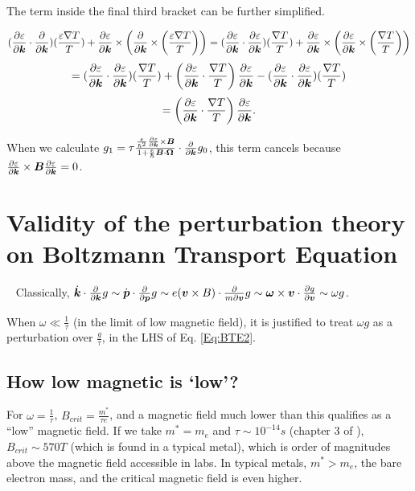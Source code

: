 \documentclass{report}
\renewcommand\vec[1]{\ensuremath\boldsymbol{#1}} %
\begin{document}
The term inside the final third bracket can be further simplified.

$$ (\frac{\partial \varepsilon}{\partial \vec{k}} \cdot \frac{\partial }{\partial \vec{k}}) (\frac{\varepsilon \nabla T}{T}) + \frac{\partial \varepsilon}{\partial \vec{k}} \times \left(  \frac{\partial }{\partial \vec{k}} \times \left(\frac{\varepsilon \nabla T}{T}\right) \right) = (\frac{\partial \varepsilon}{\partial \vec{k}} \cdot \frac{\partial \varepsilon}{\partial \vec{k}}) (\frac{ \nabla T}{T}) + \frac{\partial \varepsilon}{\partial \vec{k}} \times \left(  \frac{\partial \varepsilon}{\partial \vec{k}} \times \left(\frac{\nabla T}{T}\right) \right)$$
$$  =(\frac{\partial \varepsilon}{\partial \vec{k}} \cdot \frac{\partial \varepsilon}{\partial \vec{k}}) (\frac{ \nabla T}{T}) + \left(  \frac{\partial \varepsilon}{\partial \vec{k}} \cdot \frac{\nabla T}{T}\right) \frac{\partial \varepsilon}{\partial \vec{k}} -  (\frac{\partial \varepsilon}{\partial \vec{k}} \cdot \frac{\partial \varepsilon}{\partial \vec{k}}) (\frac{ \nabla T}{T})$$
$$= \left(  \frac{\partial \varepsilon}{\partial \vec{k}} \cdot \frac{\nabla T}{T}\right) \frac{\partial \varepsilon}{\partial \vec{k}}.$$

When we calculate $g_1 = \tau \frac{\frac{e}{\hbar^2} \frac{\partial \varepsilon}{\partial \vec{k}} \times \vec{B}}{1 + \frac{e}{\hbar} \vec{B}\cdot\vec{\Omega}} \cdot\frac{\partial}{\partial \vec{k}} g_0$, this term cancels because $\frac{\partial \varepsilon}{\partial \vec{k}} \times \vec{B}  \frac{\partial \varepsilon}{\partial \vec{k}} = 0$.
\chapter{Validity of the perturbation theory on Boltzmann Transport Equation}~\label{app:perturbation_validation}
Classically, $\dot{\vec{k}}\cdot\frac{\partial}{\partial \vec{k}} g \sim \dot{\vec{p}}\cdot\frac{\partial}{\partial \vec{p}} g \sim e (\vec{v}\times{B})\cdot\frac{\partial}{m\partial \vec{v}} g \sim \vec{\omega} \times \vec{v}\cdot \frac{\partial g}{\partial \vec{v}} \sim \omega g$.

When $\omega \ll \frac{1}{\tau}$ (in the limit of low magnetic field), it is justified to treat $\omega g$ as a perturbation over $\frac{g}{\tau}$, in the LHS of Eq. \eqref{Eq:BTE2}.
\section{How low magnetic is `low'?}
For $\omega = \frac{1}{\tau}$, $B_{crit} = \frac{m^*}{\tau e}$, and a magnetic field much lower than this qualifies as a ``low'' magnetic field. If we take $m^* = m_e$ and $\tau \sim 10^{-14} s$ (chapter 3 of \cite{book:SimonSolidState}), $B_{crit} \sim 570 T$ (which is found in a typical metal), which is order of magnitudes above the magnetic field accessible in labs. In typical metals, $m^* > m_e$, the bare electron mass, and the critical magnetic field is even higher.
\end{document}
